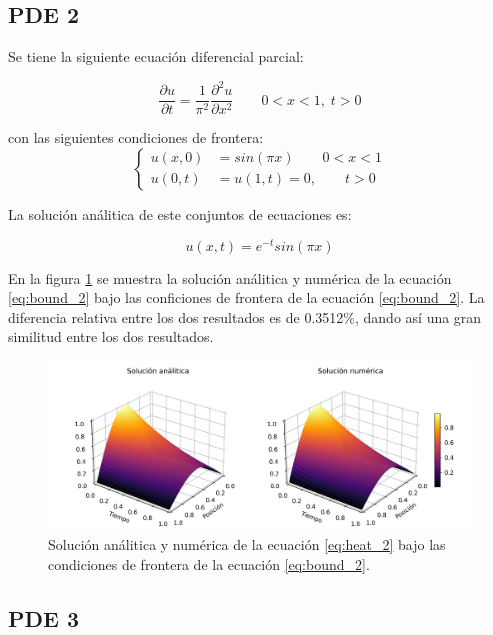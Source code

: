 \subsection{PDE 2}

Se tiene la siguiente ecuación diferencial parcial:

\begin{equation}
	\frac{\partial u}{\partial t} = \frac{1}{\pi^2}\frac{\partial^2 u}{\partial x^2} \qquad 0<x<1, \; t>0 \label{eq:heat_2}
\end{equation}

con las siguientes condiciones de frontera:
\begin{equation}
	\begin{cases}
		u(x,0) & = sin(\pi x) \qquad 0<x<1 \\
		u(0,t) & =u(1,t) = 0, \qquad t>0
	\end{cases} \label{eq:bound_2}
\end{equation}

La solución análitica de este conjuntos de ecuaciones es:

\begin{equation}
	u(x,t)= e^{-t}sin(\pi x) \label{eq:sol_2}
\end{equation}

En la figura \ref{fig:sol_2} se muestra la solución análitica y numérica de la ecuación \ref{eq:bound_2} bajo las conficiones de frontera de la ecuación \ref{eq:bound_2}. La diferencia relativa entre los dos resultados es de 0.3512\%, dando así una gran similitud entre los dos resultados.

\begin{figure}[H]
	\centering
	\includegraphics[width=17cm]{Graphics/surface_2.png}
	\caption{Solución análitica y numérica de la ecuación \ref{eq:heat_2} bajo las condiciones de frontera de la ecuación \ref{eq:bound_2}.}
	\label{fig:sol_2}
\end{figure}

\subsection{PDE 3}


